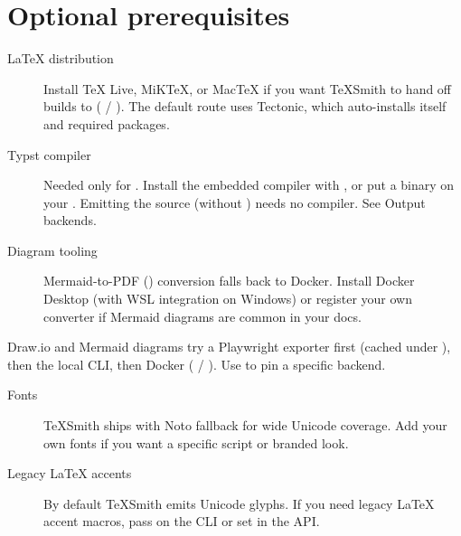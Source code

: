 \documentclass[a4paper,twoside]{article}
\begin{document}
\section{Optional prerequisites}
\begin{description}
\item[{\LaTeX{} distribution}] Install \TeX{} Live, MiKTeX, or MacTeX if you want TeXSmith to hand off builds to  ( / ). The default route uses Tectonic, which auto-installs itself and required packages.
\item[{Typst compiler}] Needed only for . Install the embedded compiler with , or put a  binary on your . Emitting the  source (without ) needs no compiler. See Output backends.
\item[{Diagram tooling}] Mermaid-to-PDF () conversion falls back to Docker. Install Docker Desktop (with WSL integration on Windows) or register your own converter if Mermaid diagrams are common in your docs.
\end{description}
Draw.io and Mermaid diagrams try a Playwright exporter first (cached under ), then the local CLI, then Docker ( / ). Use  to pin a specific backend.
\begin{description}
\item[{Fonts}] TeXSmith ships with Noto fallback for wide Unicode coverage. Add your own fonts if you want a specific script or branded look.
\item[{Legacy \LaTeX{} accents}] By default TeXSmith emits Unicode glyphs. If you need legacy \LaTeX{} accent macros, pass  on the CLI or set  in the API.
\end{description}
\end{document}
